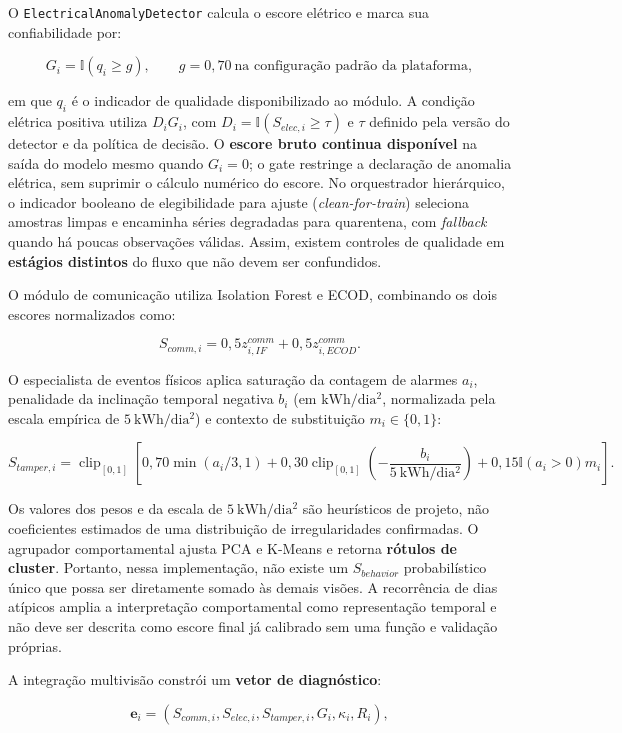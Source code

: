 O \texttt{ElectricalAnomalyDetector} calcula o escore elétrico e marca sua confiabilidade por:

\[G_i=\mathbb{I}(q_i\ge g),\qquad g=0{,}70\ \text{na configuração padrão da plataforma},\]

em que \(q_i\) é o indicador de qualidade disponibilizado ao módulo. A condição elétrica positiva utiliza \(D_iG_i\), com \(D_i=\mathbb{I}(S_{elec,i}\ge\tau)\) e \(\tau\) definido pela versão do detector e da política de decisão. O \textbf{escore bruto continua disponível} na saída do modelo mesmo quando \(G_i=0\); o gate restringe a declaração de anomalia elétrica, sem suprimir o cálculo numérico do escore. No orquestrador hierárquico, o indicador booleano de elegibilidade para ajuste (\emph{clean-for-train}) seleciona amostras limpas e encaminha séries degradadas para quarentena, com \emph{fallback} quando há poucas observações válidas. Assim, existem controles de qualidade em \textbf{estágios distintos} do fluxo que não devem ser confundidos.

O módulo de comunicação utiliza Isolation Forest e ECOD, combinando os dois escores normalizados como:

\[S_{comm,i}=0{,}5z_{i,IF}^{comm}+0{,}5z_{i,ECOD}^{comm}.\]

O especialista de eventos físicos aplica saturação da contagem de alarmes \(a_i\), penalidade da inclinação temporal negativa \(b_i\) (em \(\mathrm{kWh/dia^2}\), normalizada pela escala empírica de \(5\ \mathrm{kWh/dia^2}\)) e contexto de substituição \(m_i\in\{0,1\}\):

\[S_{tamper,i}=\operatorname{clip}_{[0,1]}\!\left[0{,}70\min(a_i/3,1)+0{,}30\operatorname{clip}_{[0,1]}\!\left(-\frac{b_i}{5\ \mathrm{kWh/dia^2}}\right)+0{,}15\mathbb{I}(a_i>0)m_i\right].\]

Os valores dos pesos e da escala de \(5\ \mathrm{kWh/dia^2}\) são heurísticos de projeto, não coeficientes estimados de uma distribuição de irregularidades confirmadas. O agrupador comportamental ajusta PCA e K-Means e retorna \textbf{rótulos de cluster}. Portanto, nessa implementação, não existe um \(S_{behavior}\) probabilístico único que possa ser diretamente somado às demais visões. A recorrência de dias atípicos amplia a interpretação comportamental como representação temporal e não deve ser descrita como escore final já calibrado sem uma função e validação próprias.

A integração multivisão constrói um \textbf{vetor de diagnóstico}:

\[\mathbf e_i=(S_{comm,i},S_{elec,i},S_{tamper,i},G_i,\kappa_i,R_i),\]

